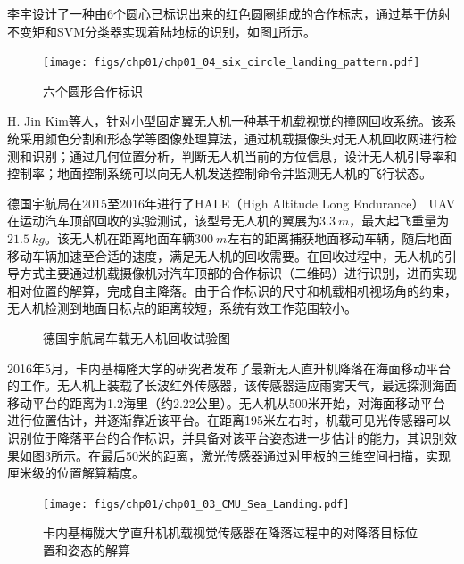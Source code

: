李宇\cite{Li_Master_2012}设计了一种由6个圆心已标识出来的红色圆圈组成的合作标志，通过基于仿射不变矩和SVM分类器实现着陆地标的识别，如图\ref{fig:chp01_04_six_circle_landing_pattern}所示。
\begin{figure}[!tb]   
	\centering	
	\texttt{[image: figs/chp01/chp01\_04\_six\_circle\_landing\_pattern.pdf]}
	\caption{六个圆形合作标识\cite{Li_Master_2012}}
	\label{fig:chp01_04_six_circle_landing_pattern}
\end{figure}

H. Jin Kim等人\cite{kim2013fully}，针对小型固定翼无人机一种基于机载视觉的撞网回收系统。该系统采用颜色分割和形态学等图像处理算法，通过机载摄像头对无人机回收网进行检测和识别；通过几何位置分析，判断无人机当前的方位信息，设计无人机引导率和控制率；地面控制系统可以向无人机发送控制命令并监测无人机的飞行状态。

德国宇航局在2015至2016年进行了HALE（High Altitude Long Endurance） UAV在运动汽车顶部回收的实验测试，该型号无人机的翼展为$3.3\ m$，最大起飞重量为$21.5\ kg$。该无人机在距离地面车辆$300\ m$左右的距离捕获地面移动车辆，随后地面移动车辆加速至合适的速度，满足无人机的回收需要。在回收过程中，无人机的引导方式主要通过机载摄像机对汽车顶部的合作标识（二维码）进行识别，进而实现相对位置的解算，完成自主降落\cite{Muskardin2016}。由于合作标识的尺寸和机载相机视场角的约束，无人机检测到地面目标点的距离较短，系统有效工作范围较小。
\begin{figure}[htb]
	\centering%
	\hspace{0em}%
	\caption{德国宇航局车载无人机回收试验图\cite{Muskardin2016}}
	\label{fig:07_ILS}
\end{figure}

2016年5月，卡内基梅隆大学的研究者发布了最新无人直升机降落在海面移动平台\cite{Grocholsky2016}的工作。无人机上装载了长波红外传感器，该传感器适应雨雾天气，最远探测海面移动平台的距离为1.2海里（约2.22公里）。无人机从500米开始，对海面移动平台进行位置估计，并逐渐靠近该平台。在距离195米左右时，机载可见光传感器可以识别位于降落平台的合作标识，并具备对该平台姿态进一步估计的能力，其识别效果如图\ref{fig:chp01_03_CMU_Sea_Landing}所示。在最后50米的距离，激光传感器通过对甲板的三维空间扫描，实现厘米级的位置解算精度。

\begin{figure}[htb]   
	\centering
	\texttt{[image: figs/chp01/chp01\_03\_CMU\_Sea\_Landing.pdf]}
	\caption{卡内基梅陇大学直升机机载视觉传感器在降落过程中的对降落目标位置和姿态的解算\cite{Grocholsky2016}}
	\label{fig:chp01_03_CMU_Sea_Landing}
\end{figure}

